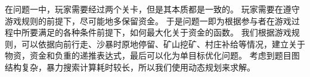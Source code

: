 在问题一中，玩家需要经过两个关卡，但是其本质都是一致的。
%
玩家需要在遵守游戏规则的前提下，尽可能地多保留资金。
%
于是问题一即为根据参与者在游戏过程中所要满足的各种条件前提下，如何最大化关于资金的函数。
%
我们根据游戏规则，可以依据向前行走、沙暴时原地停留、矿山挖矿、村庄补给等情况，建立关于物资，资金和负重的递推表达式，最后可以化为单目标优化问题。
%
考虑到题目图结构复杂，暴力搜索计算耗时较长，所以我们使用动态规划来求解。